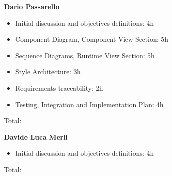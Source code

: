 \textbf{Dario Passarello}
\begin{itemize}
    \item Initial discussion and objectives definitions: 4h
    \item Component Diagram, Component View Section: 5h
    \item Sequence Diagrams, Runtime View Section: 5h
    \item Style Architecture: 3h
    \item Requirements traceability: 2h
    \item Testing, Integration and Implementation Plan: 4h
\end{itemize}

Total:

\bigskip

\textbf{Davide Luca Merli}

\begin{itemize}
    \item Initial discussion and objectives definitions: 4h
\end{itemize}

Total: